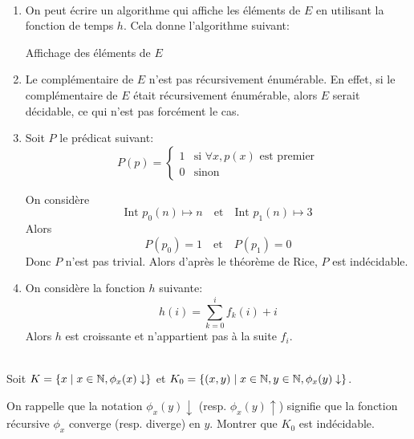 \documentclass[french,a4paper,10pt]{article}
\begin{document}
    \begin{td-sol}\,
        \begin{enumerate}
            \item On peut écrire un algorithme qui affiche les éléments de $E$ en utilisant la
            fonction de temps $h$. Cela donne l'algorithme suivant:\\
                \begin{algorithm}[H]
                    \caption{Affichage des éléments de $E$}
                \end{algorithm}
            \item Le complémentaire de $E$ n'est pas récursivement énumérable. 
            En effet, si le complémentaire de $E$ était récursivement énumérable, 
            alors $E$ serait décidable, ce qui n'est pas forcément le cas.
            \item Soit $P$ le prédicat suivant:
            \[
                P(p) = \begin{cases}
                    1& \text{si }\forall x, p(x) \text{ est premier}\\
                    0 & \text{sinon}
                \end{cases}
            \]

            On considère
            \[
                \text{Int } p_0(n) \mapsto n \quad \text{et} \quad \text{Int } p_1(n) \mapsto 3
            \]
            Alors
            \[
                P(p_0) = 1 \quad \text{et} \quad P(p_1) = 0
            \]
            Donc $P$ n'est pas trivial.
            Alors d'après le théorème de Rice, $P$ est indécidable.


            \item On considère la fonction $h$ suivante:
            \[
                h(i)=\sum_{k=0}^i f_k(i)+i
            \]
            Alors $h$ est croissante et n'appartient pas à la suite $f_i$.
        \end{enumerate}
    \end{td-sol}

    \begin{td-exo}[4 - Réduction en $K$ et $K_0$]\,\\
        Soit $K = \{x\mid x\in \mathbb{N},\phi_x(x)\downarrow\}$ et $K_0 = \{(x,y)\mid x\in \mathbb{N}, y\in \mathbb{N}, \phi_x(y)\downarrow\}$.
        
        On rappelle que la notation $\phi_x(y)\downarrow$ (resp. $\phi_x(y)\uparrow$) signifie que la fonction 
        récursive $\phi_x$ converge (resp. diverge) en $y$.
        Montrer que $K_0$ est indécidable.
    \end{td-exo}
\end{document}
